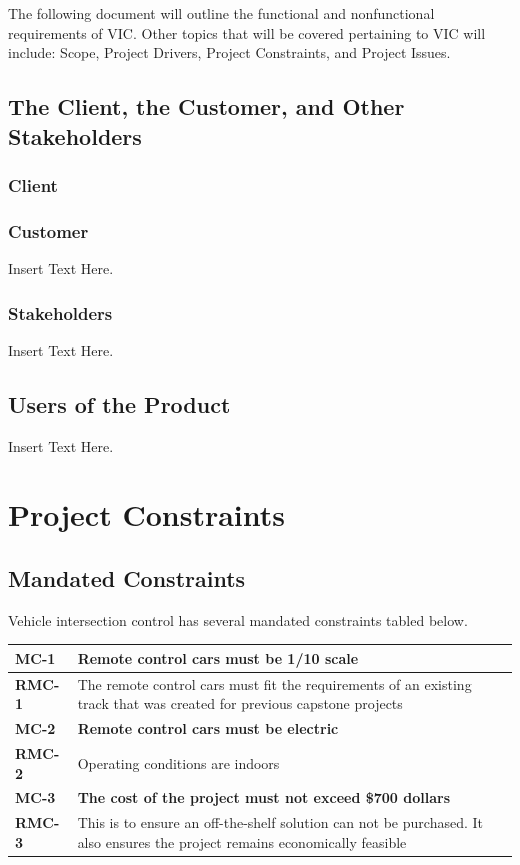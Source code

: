 \documentclass [12pt]{article}
\begin{document}
The following document will outline the functional and nonfunctional requirements of VIC.  Other topics that will be covered pertaining to VIC will include: Scope, Project Drivers, Project Constraints, and Project Issues.

\subsection{The Client, the Customer, and Other Stakeholders}

\subsubsection{Client}
\lipsum[1]  %

\subsubsection{Customer}
 Insert Text Here.

\subsubsection{Stakeholders}
 Insert Text Here.

\subsection{Users of the Product} 
Insert Text Here.\\


\section{\textbf{Project Constraints}}


\subsection{Mandated Constraints}
Vehicle intersection control has several mandated constraints tabled below. 
\begin{longtable}{| p{ } | p{ } | }\hline 
\textbf{MC-1} & \textbf{Remote control cars must be 1/10 scale} \\ \hline
\textbf{RMC-1} & The remote control cars must fit the requirements of an existing track that was created for previous capstone projects\\ \hline \hline
\textbf{MC-2}& \textbf{Remote control cars must be electric}\\ \hline 
\textbf{RMC-2} & Operating conditions are indoors  \\ \hline \hline

\textbf{MC-3} & \textbf{The cost of the project must not exceed \$700 dollars} \\ \hline
\textbf{RMC-3} & This is to ensure an off-the-shelf solution can not be purchased. It also ensures the project remains economically feasible \\ \hline
\end{longtable}
\end{document}
